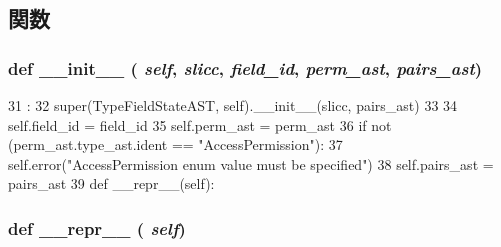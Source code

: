 \subsection{関数}
\hypertarget{classslicc_1_1ast_1_1TypeFieldStateAST_1_1TypeFieldStateAST_ac775ee34451fdfa742b318538164070e}{
\subsubsection[{\_\-\_\-init\_\-\_\-}]{\setlength{\rightskip}{0pt plus 5cm}def \_\-\_\-init\_\-\_\- ( {\em self}, \/   {\em slicc}, \/   {\em field\_\-id}, \/   {\em perm\_\-ast}, \/   {\em pairs\_\-ast})}}
\label{classslicc_1_1ast_1_1TypeFieldStateAST_1_1TypeFieldStateAST_ac775ee34451fdfa742b318538164070e}



\begin{DoxyCode}
31                                                             :
32         super(TypeFieldStateAST, self).__init__(slicc, pairs_ast)
33 
34         self.field_id = field_id
35         self.perm_ast = perm_ast
36         if not (perm_ast.type_ast.ident == "AccessPermission"):
37             self.error("AccessPermission enum value must be specified")
38         self.pairs_ast = pairs_ast
39 
    def __repr__(self):
\end{DoxyCode}
\hypertarget{classslicc_1_1ast_1_1TypeFieldStateAST_1_1TypeFieldStateAST_ad8b9328939df072e4740cd9a63189744}{
\subsubsection[{\_\-\_\-repr\_\-\_\-}]{\setlength{\rightskip}{0pt plus 5cm}def \_\-\_\-repr\_\-\_\- ( {\em self})}}
\label{classslicc_1_1ast_1_1TypeFieldStateAST_1_1TypeFieldStateAST_ad8b9328939df072e4740cd9a63189744}



